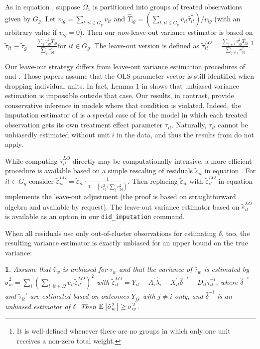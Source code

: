 \documentclass[english,11pt]{article}
\theoremstyle{plain}
\theoremstyle{plain}
\newtheorem{prop}{\protect\propositionname}
\theoremstyle{plain}
\theoremstyle{plain}
\let\ref\Cref
\providecommand{\propositionname}{Proposition}
\begin{document}
As in equation \ref{eq:taubar-G}, suppose $\Omega_{1}$ is partitioned
into groups of treated observations given by $G_{g}$. Let $v_{ig}=\sum_{t;it\in G_{g}}v_{it}$
and $\hat{T}_{ig}=\left(\sum_{t;it\in G_{g}}v_{it}\hat{\tau}_{it}^{*}\right)/v_{ig}$
(with an arbitrary value if $v_{ig}=0$). Then our \emph{non}-leave-out
variance estimator is based on $\tilde{\tau}_{it}\equiv\tilde{\tau}_{g}=\frac{\sum_{j}v_{jg}^{2}\hat{T}_{jg}}{\sum_{j}v_{jg}^{2}}$for
$it\in G_{g}$. The leave-out version is defined as $\tilde{\tau}_{it}^{LO}=\frac{\sum_{j\ne i}v_{jg}^{2}\hat{T}_{jg}}{\sum_{j\ne i}v_{jg}^{2}}$.\footnote{It is well-defined whenever there are no groups in which only one
unit receives a non-zero total weight.}

Our leave-out strategy differs from leave-out variance estimation
procedures of \textcite{MacKinnonWhite1985} and \textcite{Kline2020}.
Those papers assume that the OLS parameter vector is still identified
when dropping individual units. In fact, Lemma 1 in \textcite{Kline2020}
shows that unbiased variance estimation is impossible outside that
case. Our results, in contrast, provide conservative inference in
models where that condition is violated. Indeed, the imputation estimator
of \ref{thm:imputation} is a special case of \ref{thm:OLS-BLUE}
for the model in which each treated observation gets its own treatment
effect parameter $\tau_{it}$. Naturally, $\tau_{it}$ cannot be unbiasedly
estimated without unit $i$ in the data, and thus the results from
\textcite{Kline2020} do not apply.

While computing $\tilde{\tau}_{it}^{LO}$ directly may be computationally
intensive, a more efficient procedure is available based on a simple
rescaling of residuals $\tilde{\varepsilon}_{it}$ in equation \ref{eq:SE}.
For $it\in G_{g}$ consider $\tilde{\varepsilon}_{it}^{LO}=\tilde{\varepsilon}_{it}\cdot\frac{1}{1-\left(v_{ig}^{2}/\sum_{j}v_{jg}^{2}\right)}$.
Then replacing $\tilde{\varepsilon}_{it}$ with $\tilde{\varepsilon}_{it}^{LO}$
in equation \ref{eq:SE} implements the leave-out adjustment (the
proof is based on straightforward algebra and available by request).
The leave-out variance estimator based on $\tilde{\varepsilon}_{it}^{LO}$
is available as an option in our \texttt{did\_imputation} command.

When all residuals use only out-of-cluster observations for estimating
$\delta$, too, the resulting variance estimator is exactly unbiased
for an upper bound on the true variance:
\begin{prop}
\label{prop:leaveout}Assume that $\hat{\tau}_{w}$ is unbiased for
$\tau_{w}$ and that the variance of $\hat{\tau}_{w}$ is estimated
by $\hat{\sigma}_{w}^{2}=\sum_{i}\left(\sum_{t;it\in\Omega}v_{it}\tilde{\varepsilon}_{it}^{LO}\right)^{2}$
with $\tilde{\varepsilon}_{it}^{LO}=Y_{it}-A_{i}^{\prime}\hat{\lambda}_{i}-X_{it}^{\prime}\hat{\delta}^{-i}-D_{it}\tilde{\tau}_{it}^{-i}$,
where $\hat{\delta}^{-i}$ and $\tilde{\tau}_{it}^{-i}$ are estimated
based on outcomes $Y_{js}$ with $j\neq i$ only, and $\hat{\delta}^{-i}$
is an unbiased estimator of $\delta$. Then $\mathbb{E}\left[\hat{\sigma}_{w}^{2}\right]\geq\sigma_{w}^{2}$.
\end{prop}
\end{document}
